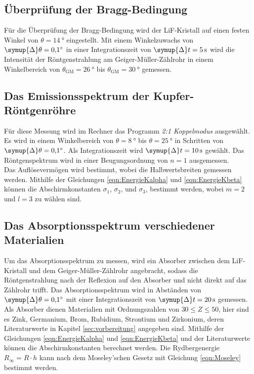 \subsection{Überprüfung der Bragg-Bedingung}

    Für die Überprüfung der Bragg-Bedingung wird der LiF-Kristall auf einen festen Winkel von $\theta = \SI{14}{\degree}$ eingestellt.
    Mit einem Winkelzuwachs von $\symup{\Delta}\theta = \SI{0.1}{\degree}$ in einer Integrationszeit von $\symup{\Delta}t = \SI{5}{\second}$
    wird die Intensität der Röntgenstrahlung am Geiger-Müller-Zählrohr in einem Winkelbereich von $\theta_\text{GM} = \SI{26}{\degree}$
    bis $\theta_\text{GM} = \SI{30}{\degree}$ gemessen.

\subsection{Das Emissionsspektrum der Kupfer-Röntgenröhre}

    Für diese Messung wird im Rechner das Programm \textit{2:1 Koppelmodus} ausgewählt.
    Es wird in einem Winkelbereich von $\theta = \SI{8}{\degree}$ bis $\theta = \SI{25}{\degree}$ in Schritten von $\symup{\Delta}\theta = \SI{0.1}{\degree}$.
    Als Integrationszeit wird $\symup{\Delta}t = \SI{10}{\second}$ gewählt.
    Das Röntgenspektrum wird in einer Beugungsordnung von $n=1$ ausgemessen.\\
    Das Auflösevermögen wird %
    bestimmt,
    wobei die Halbwertsbreiten gemessen werden.
    Mithilfe der Gleichungen \eqref{eqn:EnergieKalpha} und \eqref{eqn:EnergieKbeta} können die Abschirmkonstanten $\sigma_1$, $\sigma_2$, und $\sigma_3$, bestimmt werden,
    wobei $m=2$ und $l=3$ zu wählen sind.

\subsection{Das Absorptionsspektrum verschiedener Materialien}

    Um das Absorptionsspektrum zu messen, 
    wird ein Absorber zwischen dem LiF-Kristall und dem Geiger-Müller-Zählrohr angebracht,
    sodass die Röntgenstrahlung nach der Reflexion auf den Absorber und nicht direkt auf das Zählrohr trifft.
    Das Absorptionsspektrum wird in Abständen von $\symup{\Delta}\theta = \SI{0.1}{\degree}$ mit einer Integrationszeit von $\symup{\Delta}t = \SI{20}{\second}$ gemessen.
    Als Absorber dienen Materialien mit Ordnungszahlen von $30 \leq Z \leq 50$,
    hier sind es Zink, Germanium, Brom, Rubidium, Strontium und Zirkonium,
    deren Literaturwerte in Kapitel \ref{sec:vorbereitung} angegeben sind.
    Mithilfe der Gleichungen \eqref{eqn:EnergieKalpha} und \eqref{eqn:EnergieKbeta} und der Literaturwerte können die Abschirmkonstanten berechnet werden.
    Die Rydbergenergie $R_\infty = R \cdot h$ kann nach dem Moseley'schen Gesetz mit Gleichung \eqref{eqn:Moseley} bestimmt werden.

